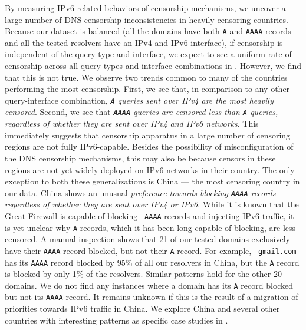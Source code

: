 By measuring IPv6-related behaviors of censorship mechanisms, we uncover
a large number of DNS censorship inconsistencies in heavily censoring
countries.
%
Because our dataset is balanced (\ie all the domains have both {\tt A} and
{\tt AAAA} records and all the tested resolvers have an IPv4 and IPv6
interface), if censorship is independent of the query type and interface, we
expect to see a uniform rate of censorship across all query types and interface
combinations in . 
%
However, we find that this is not true. We observe two trends common to many of
the countries performing the most censorship. 
%
First, we see that, in comparison to any other query-interface combination,
{\em {\tt A} queries sent over IPv4 are the most heavily censored}. Second, we
see that {\em{\tt AAAA} queries are censored less than {\tt A} queries,
regardless of whether they are sent over IPv4 and IPv6 networks}.
%
This immediately suggests that censorship apparatus in a large number of
censoring regions are not fully IPv6-capable. Besides the possibility of
misconfiguration of the DNS censorship mechanisms, this may also be because
censors in these regions are not yet widely deployed on IPv6 networks in their
country.
%
The only exception to both these generalizations is China --- the most
censoring country in our data. China shows an unusual {\em preference towards
blocking {\tt AAAA} records regardless of whether they are sent over IPv4 or
IPv6}. While it is known that the Great Firewall is capable of blocking {\tt
AAAA} records and injecting IPv6 traffic, it is yet unclear why {\tt A}
records, which it has been long capable of blocking, are less censored.
A manual inspection shows that 21 of our tested domains exclusively have their
{\tt AAAA} record blocked, but not their {\tt A} record. For example, {\tt
gmail.com} has its {\tt AAAA} record blocked by 95\% of all our resolvers in
China, but the {\tt A} record is blocked by only 1\% of the resolvers. Similar
patterns hold for the other 20 domains. We do not find any instances where
a domain has its {\tt A} record blocked but not its {\tt AAAA} record. 
%
It remains unknown if this is the result of a migration of priorities towards
IPv6 traffic in China. We explore China and several other countries with
interesting patterns as specific case studies in .

